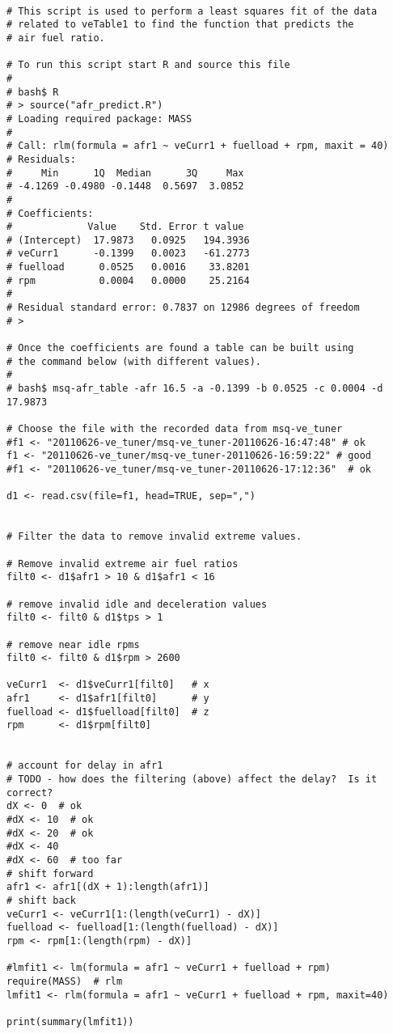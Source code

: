 
\begin{verbatim}

# This script is used to perform a least squares fit of the data
# related to veTable1 to find the function that predicts the
# air fuel ratio.

# To run this script start R and source this file
#
# bash$ R
# > source("afr_predict.R")
# Loading required package: MASS
# 
# Call: rlm(formula = afr1 ~ veCurr1 + fuelload + rpm, maxit = 40)
# Residuals:
#     Min      1Q  Median      3Q     Max 
# -4.1269 -0.4980 -0.1448  0.5697  3.0852 
# 
# Coefficients:
#             Value    Std. Error t value 
# (Intercept)  17.9873   0.0925   194.3936
# veCurr1      -0.1399   0.0023   -61.2773
# fuelload      0.0525   0.0016    33.8201
# rpm           0.0004   0.0000    25.2164
# 
# Residual standard error: 0.7837 on 12986 degrees of freedom
# >

# Once the coefficients are found a table can be built using
# the command below (with different values).
#
# bash$ msq-afr_table -afr 16.5 -a -0.1399 -b 0.0525 -c 0.0004 -d 17.9873

# Choose the file with the recorded data from msq-ve_tuner
#f1 <- "20110626-ve_tuner/msq-ve_tuner-20110626-16:47:48" # ok
f1 <- "20110626-ve_tuner/msq-ve_tuner-20110626-16:59:22" # good
#f1 <- "20110626-ve_tuner/msq-ve_tuner-20110626-17:12:36"  # ok

d1 <- read.csv(file=f1, head=TRUE, sep=",")


# Filter the data to remove invalid extreme values.

# Remove invalid extreme air fuel ratios
filt0 <- d1$afr1 > 10 & d1$afr1 < 16

# remove invalid idle and deceleration values
filt0 <- filt0 & d1$tps > 1

# remove near idle rpms
filt0 <- filt0 & d1$rpm > 2600

veCurr1  <- d1$veCurr1[filt0]  	# x
afr1 	 <- d1$afr1[filt0]  	# y
fuelload <- d1$fuelload[filt0]  # z
rpm 	 <- d1$rpm[filt0]


# account for delay in afr1
# TODO - how does the filtering (above) affect the delay?  Is it correct?
dX <- 0  # ok
#dX <- 10  # ok
#dX <- 20  # ok
#dX <- 40
#dX <- 60  # too far
# shift forward
afr1 <- afr1[(dX + 1):length(afr1)]
# shift back
veCurr1 <- veCurr1[1:(length(veCurr1) - dX)]
fuelload <- fuelload[1:(length(fuelload) - dX)]
rpm <- rpm[1:(length(rpm) - dX)]

#lmfit1 <- lm(formula = afr1 ~ veCurr1 + fuelload + rpm)
require(MASS)  # rlm
lmfit1 <- rlm(formula = afr1 ~ veCurr1 + fuelload + rpm, maxit=40)

print(summary(lmfit1))

\end{verbatim}
